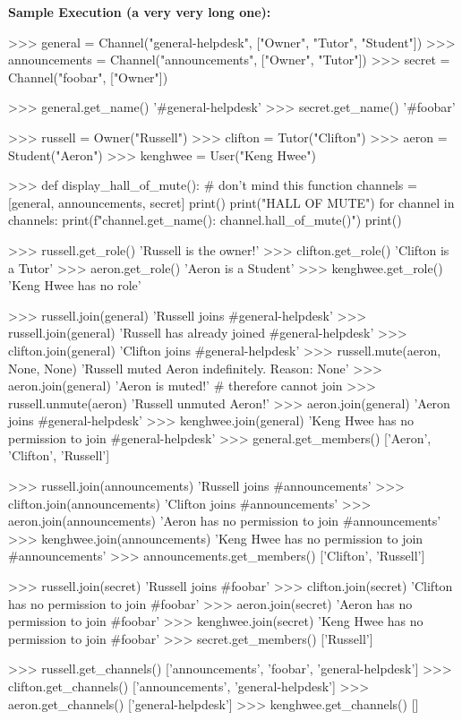 \newpage

\textbf{Sample Execution (a very very long one):}
\begin{python}
>>> general = Channel("general-helpdesk", ["Owner", "Tutor", "Student"])
>>> announcements = Channel("announcements", ["Owner", "Tutor"])
>>> secret = Channel("foobar", ["Owner"])

>>> general.get_name()
'#general-helpdesk'
>>> secret.get_name()
'#foobar'

>>> russell = Owner("Russell")
>>> clifton = Tutor("Clifton")
>>> aeron = Student("Aeron")
>>> kenghwee = User("Keng Hwee")

>>> def display_hall_of_mute(): # don't mind this function
        channels = [general, announcements, secret]
        print()
        print("HALL OF MUTE")
        for channel in channels:
            print(f"{channel.get_name()}: {channel.hall_of_mute()}")
        print()

>>> russell.get_role()
'Russell is the owner!'
>>> clifton.get_role()
'Clifton is a Tutor'
>>> aeron.get_role()
'Aeron is a Student'
>>> kenghwee.get_role()
'Keng Hwee has no role'

>>> russell.join(general)
'Russell joins #general-helpdesk'
>>> russell.join(general)
'Russell has already joined #general-helpdesk'
>>> clifton.join(general)
'Clifton joins #general-helpdesk'
>>> russell.mute(aeron, None, None)
'Russell muted Aeron indefinitely. Reason: None'
>>> aeron.join(general)
'Aeron is muted!' # therefore cannot join
>>> russell.unmute(aeron)
'Russell unmuted Aeron!'
>>> aeron.join(general)
'Aeron joins #general-helpdesk'
>>> kenghwee.join(general)
'Keng Hwee has no permission to join #general-helpdesk'
>>> general.get_members()
['Aeron', 'Clifton', 'Russell']

>>> russell.join(announcements)
'Russell joins #announcements'
>>> clifton.join(announcements)
'Clifton joins #announcements'
>>> aeron.join(announcements)
'Aeron has no permission to join #announcements'
>>> kenghwee.join(announcements)
'Keng Hwee has no permission to join #announcements'
>>> announcements.get_members()
['Clifton', 'Russell']

>>> russell.join(secret)
'Russell joins #foobar'
>>> clifton.join(secret)
'Clifton has no permission to join #foobar'
>>> aeron.join(secret)
'Aeron has no permission to join #foobar'
>>> kenghwee.join(secret)
'Keng Hwee has no permission to join #foobar'
>>> secret.get_members()
['Russell']

>>> russell.get_channels()
['announcements', 'foobar', 'general-helpdesk']
>>> clifton.get_channels()
['announcements', 'general-helpdesk']
>>> aeron.get_channels()
['general-helpdesk']
>>> kenghwee.get_channels()
[]


\end{python}
